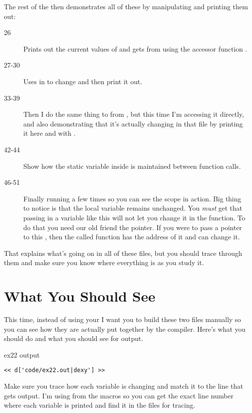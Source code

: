 The rest of the  then demonstrates all of these by
manipulating and printing them out:

\begin{description}
\item[26] Prints out the current values of  and gets
     from  using the accessor function
    .
\item[27-30] Uses  in  to change 
    and then print it out.
\item[33-39] Then I do the same thing to  from ,
    but this time I'm accessing it directly, and also demonstrating that it's
    actually changing in that file by printing it here and with .
\item[42-44] Show how the static variable  inside 
    is maintained between function calls.
\item[46-51] Finally running  a few times so you can see
    the scope in action.  Big thing to notice is that the local 
    variable remains unchanged.  You \emph{must} get that passing in a variable
    like this will not let you change it in the function.  To do that you need
    our old friend the pointer.  If you were to pass a pointer to this ,
    then the called function has the address of it and can change it.
\end{description}

That explains what's going on in all of these files, but you should trace
through them and make sure you know where everything is as you study it.

\section{What You Should See}

This time, instead of using your  I want you to build these
two files manually so you can see how they are actually put together by
the compiler.  Here's what you should do and what you should see for output.

\begin{code}{ex22 output}
\begin{lstlisting}
<< d['code/ex22.out|dexy'] >>
\end{lstlisting}
\end{code}

Make sure you trace how each variable is changing and match it to the line
that gets output.  I'm using  from the  macros
so you can get the exact line number where each variable is printed and
find it in the files for tracing.

